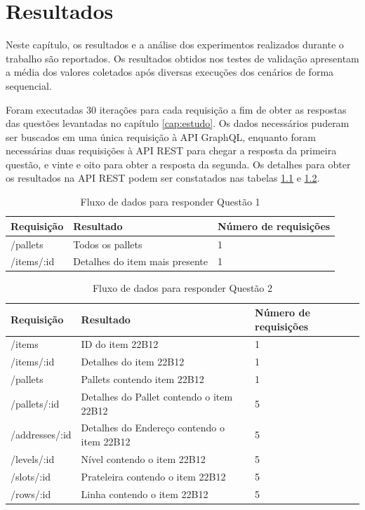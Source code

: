 \chapter{Resultados}

Neste capítulo, os resultados e a análise dos experimentos realizados durante o trabalho são reportados. Os resultados obtidos nos testes de validação apresentam a média dos valores coletados após diversas execuções dos cenários de forma sequencial.

Foram executadas 30 iterações para cada requisição a fim de obter as respostas das questões levantadas no capítulo \ref{cap:estudo}. Os dados necessários puderam ser buscados em uma única requisição à API GraphQL, enquanto foram necessárias duas requisições à API REST para chegar a resposta da primeira questão, e vinte e oito para obter a resposta da segunda. Os detalhes para obter os resultados na API REST podem ser constatados nas tabelas \ref{tab:request-table1} e \ref{tab:request-table2}.

\begin{table}[htbp]
    \centering
    \begin{tabular}{| l | l | l |}
        \hline
        \textbf{Requisição} & \textbf{Resultado} & \textbf{Número de requisições} \\ \hline
        /pallets & Todos os pallets & 1 \\ \hline
        /items/:id & Detalhes do item mais presente & 1 \\ \hline
    \end{tabular}
    \caption{Fluxo de dados para responder Questão 1} 
    \label{tab:request-table1}
\end{table}

\begin{table}[htbp]
    \centering
    \begin{tabular}{| l | l | l |}
        \hline
        \textbf{Requisição} & \textbf{Resultado} & \textbf{Número de requisições} \\ \hline
        /items & ID do item 22B12 & 1 \\ \hline
        /items/:id & Detalhes do item 22B12 & 1 \\ \hline
        /pallets & Pallets contendo item 22B12 & 1 \\ \hline
        /pallets/:id & Detalhes do Pallet contendo o item 22B12 & 5 \\ \hline
        /addresses/:id & Detalhes do Endereço contendo o item 22B12 & 5 \\ \hline
        /levels/:id & Nível contendo o item 22B12 & 5 \\ \hline
        /slots/:id & Prateleira contendo o item 22B12 & 5  \\ \hline
        /rows/:id & Linha contendo o item 22B12 & 5 \\ \hline
    \end{tabular}
    \caption{Fluxo de dados para responder Questão 2} 
    \label{tab:request-table2}
\end{table}

